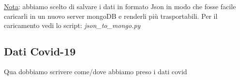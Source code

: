 \underline{Nota}: abbiamo scelto di salvare i dati in formato Json in modo che fosse facile caricarli in un nuovo server mongoDB e renderli più trasportabili. Per il caricamento vedi lo script: \textit{json\_to\_mongo.py}

\subsection*{Dati Covid-19}
Qua dobbiamo scrivere come/dove abbiamo preso i dati covid
